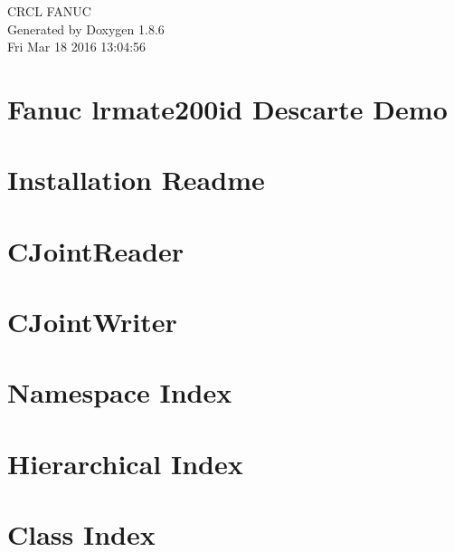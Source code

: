 \documentclass[twoside]{book}
\newcommand{\clearemptydoublepage}{%
  \newpage{\pagestyle{empty}\cleardoublepage}%
}
\begin{document}
\hypersetup{pageanchor=false}
\begin{titlepage}
\vspace*{7cm}
\begin{center}%
{\Large C\-R\-C\-L F\-A\-N\-U\-C }\\
\vspace*{1cm}
{\large Generated by Doxygen 1.8.6}\\
\vspace*{0.5cm}
{\small Fri Mar 18 2016 13:04:56}\\
\end{center}
\end{titlepage}
\clearemptydoublepage
\tableofcontents
\clearemptydoublepage
{}
\hypersetup{pageanchor=true}

\chapter{Fanuc lrmate200id Descarte Demo}
\label{md_markdown_Readme}
\hypertarget{md_markdown_Readme}{}

\chapter{Installation Readme}
\label{md_markdown_Installation}
\hypertarget{md_markdown_Installation}{}

\chapter{C\-Joint\-Reader}
\label{md_markdown_JointReader}
\hypertarget{md_markdown_JointReader}{}

\chapter{C\-Joint\-Writer}
\label{md_markdown_JointWriter}
\hypertarget{md_markdown_JointWriter}{}

\chapter{Namespace Index}

\chapter{Hierarchical Index}

\chapter{Class Index}

\end{document}
